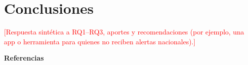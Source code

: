 \documentclass[12pt,a4paper]{article}
\newcommand{\relleno}[1]{\textcolor{red}{[#1]}}
\begin{document}
\section{Conclusiones}
\relleno{Respuesta sintética a RQ1--RQ3, aportes y recomendaciones (por ejemplo, una app o herramienta para quienes no reciben alertas nacionales).}

\newpage
\begin{center}\textbf{Referencias}\end{center}
\printbibliography[heading=none]
\end{document}
